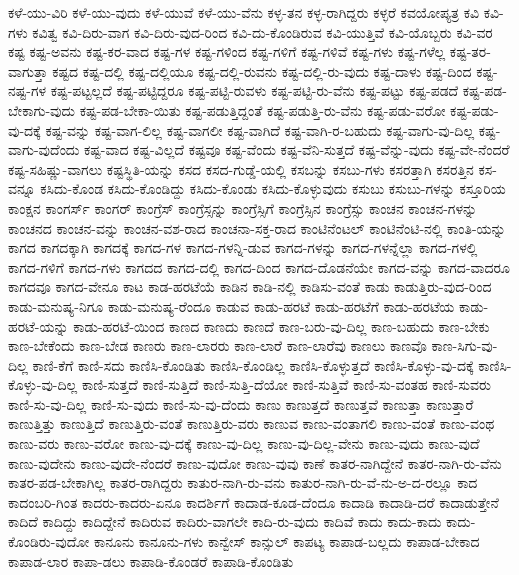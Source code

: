 {ಕಳೆ-ಯು-ವಿರಿ
ಕಳೆ-ಯು-ವುದು
ಕಳೆ-ಯುವೆ
ಕಳೆ-ಯು-ವೆನು
ಕಳ್ಳ-ತನ
ಕಳ್ಳ-ರಾಗಿದ್ದರು
ಕಳ್ಳರೆ
ಕವಯೋಪ್ಯತ್ರ
ಕವಿ
ಕವಿ-ಗಳು
ಕವಿತ್ವ
ಕವಿ-ದಿರು-ವಾಗ
ಕವಿ-ದಿರು-ವುದ-ರಿಂದ
ಕವಿ-ದು-ಕೊಂಡಿರುವ
ಕವಿ-ಯುತ್ತಿವೆ
ಕವಿ-ಯೊಬ್ಬರು
ಕವಿ-ವರ
ಕಷ್ಟ
ಕಷ್ಟ-ಅವನು
ಕಷ್ಟ-ಕರ-ವಾದ
ಕಷ್ಟ-ಗಳ
ಕಷ್ಟ-ಗಳಿಂದ
ಕಷ್ಟ-ಗಳಿಗೆ
ಕಷ್ಟ-ಗಳಿವೆ
ಕಷ್ಟ-ಗಳು
ಕಷ್ಟ-ಗಳೆಲ್ಲ
ಕಷ್ಟ-ತರ-ವಾಗುತ್ತಾ
ಕಷ್ಟದ
ಕಷ್ಟ-ದಲ್ಲಿ
ಕಷ್ಟ-ದಲ್ಲಿಯೂ
ಕಷ್ಟ-ದಲ್ಲಿ-ರುವನು
ಕಷ್ಟ-ದಲ್ಲಿ-ರು-ವುದು
ಕಷ್ಟ-ದಾಳು
ಕಷ್ಟ-ದಿಂದ
ಕಷ್ಟ-ನಷ್ಟ-ಗಳ
ಕಷ್ಟ-ಪಟ್ಟಲ್ಲದೆ
ಕಷ್ಟ-ಪಟ್ಟಿದ್ದರೂ
ಕಷ್ಟ-ಪಟ್ಟಿ-ರುವಳು
ಕಷ್ಟ-ಪಟ್ಟಿ-ರು-ವೆನು
ಕಷ್ಟ-ಪಟ್ಟು
ಕಷ್ಟ-ಪಡದೆ
ಕಷ್ಟ-ಪಡ-ಬೇಕಾಗು-ವುದು
ಕಷ್ಟ-ಪಡ-ಬೇಕಾ-ಯಿತು
ಕಷ್ಟ-ಪಡುತ್ತಿದ್ದಂತೆ
ಕಷ್ಟ-ಪಡುತ್ತಿ-ರು-ವೆನು
ಕಷ್ಟ-ಪಡು-ವರೋ
ಕಷ್ಟ-ಪಡು-ವು-ದಕ್ಕೆ
ಕಷ್ಟ-ವನ್ನು
ಕಷ್ಟ-ವಾಗ-ಲಿಲ್ಲ
ಕಷ್ಟ-ವಾಗಲೀ
ಕಷ್ಟ-ವಾಗಿದೆ
ಕಷ್ಟ-ವಾಗಿ-ರ-ಬಹುದು
ಕಷ್ಟ-ವಾಗು-ವು-ದಿಲ್ಲ
ಕಷ್ಟ-ವಾಗು-ವುದೆಂದು
ಕಷ್ಟ-ವಾದ
ಕಷ್ಟ-ವಿಲ್ಲದೆ
ಕಷ್ಟವೂ
ಕಷ್ಟ-ವೆಂದು
ಕಷ್ಟ-ವೆನಿ-ಸುತ್ತದೆ
ಕಷ್ಟ-ವೆನ್ನು-ವುದು
ಕಷ್ಟ-ವೇ-ನೆಂದರೆ
ಕಷ್ಟ-ಸಹಿಷ್ಣು-ವಾಗಲು
ಕಷ್ಟಸ್ಥಿತಿ-ಯನ್ನು
ಕಸದ
ಕಸದ-ಗುಡ್ಡೆ-ಯಲ್ಲಿ
ಕಸಬನ್ನು
ಕಸಬು-ಗಳು
ಕಸರತ್ತಾಗಿ
ಕಸರತ್ತಿನ
ಕಸ-ವನ್ನೂ
ಕಸಿದು-ಕೊಂಡ
ಕಸಿದು-ಕೊಂಡಿದ್ದು
ಕಸಿದು-ಕೊಂಡು
ಕಸಿದು-ಕೊಳ್ಳುವುದು
ಕಸುಬು
ಕಸುಬು-ಗಳನ್ನು
ಕಸ್ತೂರಿಯ
ಕಾಂಕ್ಷನ
ಕಾಂಗರ್ಸ್
ಕಾಂಗರ್
ಕಾಂಗ್ರೆಸ್
ಕಾಂಗ್ರೆಸ್ಸನ್ನು
ಕಾಂಗ್ರೆಸ್ಸಿಗೆ
ಕಾಂಗ್ರೆಸ್ಸಿನ
ಕಾಂಗ್ರೆಸ್ಸು
ಕಾಂಚನ
ಕಾಂಚನ-ಗಳನ್ನು
ಕಾಂಚನದ
ಕಾಂಚನ-ವನ್ನು
ಕಾಂಚನ-ವಶ-ರಾದ
ಕಾಂಚನಾ-ಸಕ್ತ-ರಾದ
ಕಾಂಟಿನೆಂಟಲ್
ಕಾಂಟಿನೆಂಟಿ-ನಲ್ಲಿ
ಕಾಂತಿ-ಯನ್ನು
ಕಾಗದ
ಕಾಗದಕ್ಕಾಗಿ
ಕಾಗದಕ್ಕೆ
ಕಾಗದ-ಗಳ
ಕಾಗದ-ಗಳನ್ನಿ-ಡುವ
ಕಾಗದ-ಗಳನ್ನು
ಕಾಗದ-ಗಳನ್ನೆಲ್ಲಾ
ಕಾಗದ-ಗಳಲ್ಲಿ
ಕಾಗದ-ಗಳಿಗೆ
ಕಾಗದ-ಗಳು
ಕಾಗದದ
ಕಾಗದ-ದಲ್ಲಿ
ಕಾಗದ-ದಿಂದ
ಕಾಗದ-ದೊಡನೆಯೇ
ಕಾಗದ-ವನ್ನು
ಕಾಗದ-ವಾದರೂ
ಕಾಗದವೂ
ಕಾಗದ-ವೇನೂ
ಕಾಟ
ಕಾಡ-ಹರಟೆಯೆ
ಕಾಡಿನ
ಕಾಡಿ-ನಲ್ಲಿ
ಕಾಡಿಸು-ವಂತೆ
ಕಾಡು
ಕಾಡುತ್ತಿರು-ವುದ-ರಿಂದ
ಕಾಡು-ಮನುಷ್ಯ-ನಿಗೂ
ಕಾಡು-ಮನುಷ್ಯ-ರೆಂದೂ
ಕಾಡುವ
ಕಾಡು-ಹರಟೆ
ಕಾಡು-ಹರಟೆಗೆ
ಕಾಡು-ಹರಟೆಯ
ಕಾಡು-ಹರಟೆ-ಯನ್ನು
ಕಾಡು-ಹರಟೆ-ಯಿಂದ
ಕಾಣದ
ಕಾಣದು
ಕಾಣದೆ
ಕಾಣ-ಬರು-ವು-ದಿಲ್ಲ
ಕಾಣ-ಬಹುದು
ಕಾಣ-ಬೇಕು
ಕಾಣ-ಬೇಕೆಂದು
ಕಾಣ-ಬೇಡ
ಕಾಣರು
ಕಾಣ-ಲಾರರು
ಕಾಣ-ಲಾರೆ
ಕಾಣ-ಲಾರೆವು
ಕಾಣಲು
ಕಾಣವೊ
ಕಾಣ-ಸಿಗು-ವು-ದಿಲ್ಲ
ಕಾಣಿ-ಕೆಗೆ
ಕಾಣಿ-ಸದು
ಕಾಣಿಸಿ-ಕೊಂಡಿತು
ಕಾಣಿಸಿ-ಕೊಂಡಿಲ್ಲ
ಕಾಣಿಸಿ-ಕೊಳ್ಳುತ್ತದೆ
ಕಾಣಿಸಿ-ಕೊಳ್ಳು-ವು-ದಕ್ಕೆ
ಕಾಣಿಸಿ-ಕೊಳ್ಳು-ವು-ದಿಲ್ಲ
ಕಾಣಿ-ಸುತ್ತದೆ
ಕಾಣಿ-ಸುತ್ತಿದೆ
ಕಾಣಿ-ಸುತ್ತಿ-ದೆಯೋ
ಕಾಣಿ-ಸುತ್ತಿವೆ
ಕಾಣಿ-ಸು-ವಂತಹ
ಕಾಣಿ-ಸುವರು
ಕಾಣಿ-ಸು-ವು-ದಿಲ್ಲ
ಕಾಣಿ-ಸು-ವುದು
ಕಾಣಿ-ಸು-ವು-ದೆಂದು
ಕಾಣು
ಕಾಣುತ್ತದೆ
ಕಾಣುತ್ತವೆ
ಕಾಣುತ್ತಾ
ಕಾಣುತ್ತಾರೆ
ಕಾಣುತ್ತಿತ್ತು
ಕಾಣುತ್ತಿದೆ
ಕಾಣುತ್ತಿರು-ವಂತೆ
ಕಾಣುತ್ತಿರು-ವರು
ಕಾಣುವ
ಕಾಣು-ವಂತಾಗಲಿ
ಕಾಣು-ವಂತೆ
ಕಾಣು-ವಂಥ
ಕಾಣು-ವರು
ಕಾಣು-ವರೋ
ಕಾಣು-ವು-ದಕ್ಕೆ
ಕಾಣು-ವು-ದಿಲ್ಲ
ಕಾಣು-ವು-ದಿಲ್ಲ-ವೇನು
ಕಾಣು-ವುದು
ಕಾಣು-ವುದೆ
ಕಾಣು-ವುದೇನು
ಕಾಣು-ವುದೇ-ನೆಂದರೆ
ಕಾಣು-ವುದೋ
ಕಾಣು-ವುವು
ಕಾಣೆ
ಕಾತರ-ನಾಗಿದ್ದೇನೆ
ಕಾತರ-ನಾಗಿ-ರು-ವೆನು
ಕಾತರ-ಪಡ-ಬೇಕಾಗಿಲ್ಲ
ಕಾತರ-ರಾಗಿದ್ದರು
ಕಾತುರ-ನಾಗಿ-ರು-ವನು
ಕಾತುರ-ನಾಗಿ-ರು-ವೆ-ನು-ಅ-ದ-ರಲ್ಲೂ
ಕಾದ
ಕಾದಂಬರಿ-ಗಿಂತ
ಕಾದರು-ಕಾದರು-ಏನೂ
ಕಾದರ್ಶಿಗೆ
ಕಾದಾಡ-ಕೂಡ-ದೆಂದೂ
ಕಾದಾಡಿ
ಕಾದಾಡಿ-ದರೆ
ಕಾದಾಡುತ್ತೇನೆ
ಕಾದಿದೆ
ಕಾದಿದ್ದು
ಕಾದಿದ್ದೇನೆ
ಕಾದಿರುವ
ಕಾದಿರು-ವಾಗಲೇ
ಕಾದಿ-ರು-ವುದು
ಕಾದಿವೆ
ಕಾದು
ಕಾದು-ಕಾದು
ಕಾದು-ಕೊಂಡಿರು-ವುದೋ
ಕಾನೂನು
ಕಾನೂನು-ಗಳು
ಕಾನ್ವೇಸ್
ಕಾನ್ಸುಲ್
ಕಾಪಟ್ಯ
ಕಾಪಾಡ-ಬಲ್ಲದು
ಕಾಪಾಡ-ಬೇಕಾದ
ಕಾಪಾಡ-ಲಾರ
ಕಾಪಾ-ಡಲು
ಕಾಪಾಡಿ-ಕೊಂಡರೆ
ಕಾಪಾಡಿ-ಕೊಂಡಿತು
}
